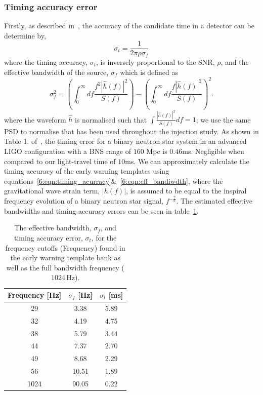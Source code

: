 \subsubsection{\label{6:sec:timing_error}Timing accuracy error}

Firstly, as described in~\cite{Fairhurst:2010}, the accuracy of the candidate time in a detector can be determine by,
%
\begin{equation}
    \sigma_{t} = \frac{1}{2\pi\rho\sigma_{f}}
    \label{6:eqn:timing_acurracy}
\end{equation}
%
where the timing accuracy, $\sigma_{t}$, is inversely proportional to the SNR, $\rho$, and the effective bandwidth of the source, $\sigma_{f}$ which is defined as
%
\begin{equation}
    \sigma_{f}^2 = \left(\int^{\infty}_{0} df \frac{f^{2}|\hat{h}(f)|^{2}}{S(f)}\right) - \left( \int^{\infty}_{0} df \frac{f|\hat{h}(f)|^{2}}{S(f)}\right)^{2} .
    \label{6:eqn:eff_bandiwdth}
\end{equation}
%
where the waveform $\hat{h}$ is normalised such that $\int \frac{|\hat{h}(f)|^{2}}{S(f)}df = 1$; we use the same PSD to normalise that has been used throughout the injection study. As shown in Table 1. of~\cite{Fairhurst:2010}, the timing error for a binary neutron star system in an advanced LIGO configuration with a BNS range of $160$ Mpc is $0.46$ms. Negligible when compared to our light-travel time of $10$ms. We can approximately calculate the timing accuracy of the early warning templates using equations~\ref{6:eqn:timing_acurracy}\&~\ref{6:eqn:eff_bandiwdth}, where the gravitational wave strain term, $|h(f)|$, is assumed to be equal to the inspiral frequency evolution of a binary neutron star signal, $f^{-\frac{7}{6}}$. The estimated effective bandwidths and timing accuracy errors can be seen in table~\ref{6:tab:timing_errors}.
%
\begin{table}[ht]
    \centering
    \setlength{\tabcolsep}{4pt}
    \begin{tabular}{ccc}
        \toprule
        \textbf{Frequency [Hz]} & $\sigma_{f}$ [Hz] & $\sigma_{t}$ [ms] \\
        \midrule
        29 & 3.38 & 5.89 \\
        32 & 4.19 & 4.75 \\
        38 & 5.79 & 3.44 \\
        44 & 7.37 & 2.70 \\
        49 & 8.68 & 2.29 \\
        56 & 10.51 & 1.89 \\
        1024 & 90.05 & 0.22 \\
        \bottomrule
    \end{tabular}
    \caption{The effective bandwidth, $\sigma_{f}$, and timing accuracy error, $\sigma_{t}$, for the frequency cutoffs (Frequency) found in the early warning template bank as well as the full bandwidth frequency ($1024 \, \text{Hz}$).}
    \label{6:tab:timing_errors}
\end{table}
